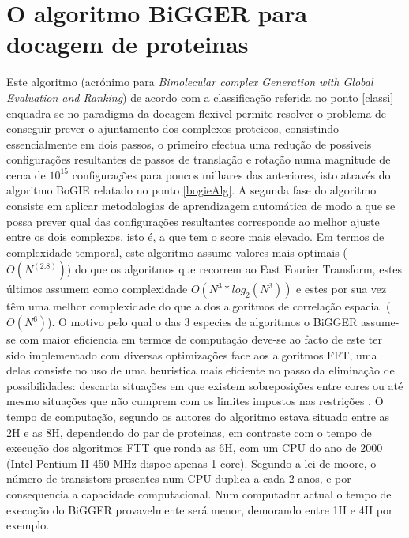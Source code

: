 \section{O algoritmo BiGGER para docagem de proteinas}
\label{biggerAlg}
Este algoritmo (acrónimo para \textit{Bimolecular complex Generation with Global Evaluation and Ranking}) \cite{teseProf} de acordo com a classificação referida no ponto \ref{classi} enquadra-se no paradigma da docagem flexivel\cite{biggerPaper}
 permite resolver o problema de conseguir prever o ajuntamento dos complexos proteicos, 
consistindo essencialmente em dois passos, o primeiro efectua uma redução de possiveis configurações resultantes de passos de translação e rotação numa magnitude de cerca de $10^{15}$ configurações para poucos milhares das anteriores, isto através do algoritmo BoGIE relatado no ponto \ref{bogieAlg}. A segunda fase do algoritmo consiste em aplicar metodologias de aprendizagem automática de modo a que se possa prever qual das configurações resultantes corresponde ao melhor ajuste entre os dois complexos, isto é, a que tem o score mais elevado.
Em termos de complexidade temporal, este algoritmo assume valores mais optimais ($O(N^(2.8))$\cite{biggerPaper}) do que os algoritmos que recorrem ao Fast Fourier Transform, estes últimos assumem como complexidade $O(N^{3}*log_2(N^{3}))$\cite{teseProf} e estes por sua vez têm uma melhor complexidade do que a dos algoritmos de correlação espacial ($O(N^6)$). O motivo pelo qual o das 3 especies de algoritmos o BiGGER assume-se com maior eficiencia em termos de computação deve-se ao facto de este ter sido implementado com diversas optimizações face aos algoritmos FFT, uma delas consiste no uso de uma heuristica mais eficiente no passo da eliminação de possibilidades: descarta situações em que existem sobreposições entre cores ou até mesmo situações que não cumprem com os limites impostos nas restrições \cite{biggerPaper}. 
O tempo de computação, segundo os autores do algoritmo estava situado entre as 2H e as 8H, dependendo do par de proteinas, em contraste com o tempo de execução dos algoritmos FTT que ronda as 6H, com um CPU do ano de 2000 (Intel Pentium II 450 MHz dispoe apenas 1 core)\cite{biggerPaper}. Segundo a lei de moore, o número de transistors presentes num CPU duplica a cada 2 anos, e por consequencia a capacidade computacional. Num computador actual o tempo de execução do BiGGER provavelmente será menor, demorando entre 1H e 4H por exemplo.



